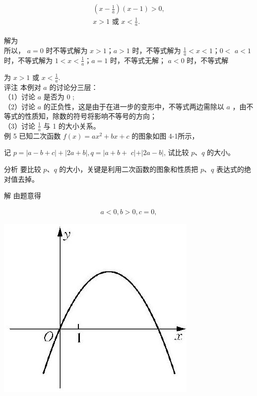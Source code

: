 \documentclass[10pt]{article}
\begin{document}
\begin{align*}
\begin{gathered}
\left(x-\frac{1}{a}\right)(x-1)>0, \\
x>1 \text { 或 } x<\frac{1}{a} .
\end{gathered}
\end{align*}

解为\\
所以， $a=0$ 时不等式解为 $x>1 ； a>1$ 时，不等式解为 $\frac{1}{a}<x<1 ； 0<$ $a<1$ 时，不等式解为 $1<x<\frac{1}{a} ； a=1$ 时，不等式无解； $a<0$ 时，不等式解

为 $x>1$ 或 $x<\frac{1}{a}$.\\
评注 本例对 $a$ 的讨论分三层：\\
（1）讨论 $a$ 是否为 0 ;\\
（2）讨论 $a$ 的正负性，这是由于在进一步的变形中，不等式两边需除以 $a$ ，由不等式的性质知，除数的符号将影响不等号的方向；\\
（3）讨论 $\frac{1}{a}$ 与 1 的大小关系。\\
例 5 已知二次函数 $f(x)=a x^{2}+b x+c$ 的图象如图 4-1所示，

记 $p=|a-b+c|+|2 a+b|, q=\mid a+b+$ $c|+|2 a-b|$, 试比较 $p 、 q$ 的大小。

分析 要比较 $p 、 q$ 的大小，关键是利用二次函数的图象和性质把 $p 、 q$ 表达式的绝对值去掉。

解 由题意得

\begin{align*}
a<0, b>0, c=0,
\end{align*}

\begin{center}
\includegraphics[max width=\textwidth]{2024_10_30_1bf34f7aeb61f11d11d3g-059}
\end{center}
\end{document}
